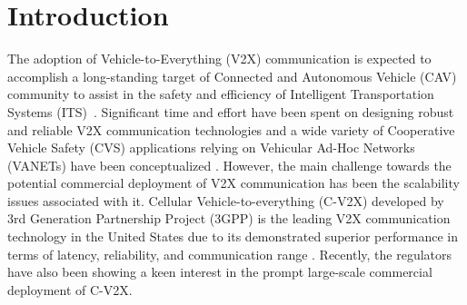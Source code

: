 \documentclass[iicol]{sn-jnl}%
\theoremstyle{thmstyleone}%
\theoremstyle{thmstyletwo}%
\theoremstyle{thmstylethree}%
\begin{document}
\section{Introduction}\label{sec1}
The adoption of Vehicle-to-Everything (V2X) communication is expected to accomplish a long-standing target of Connected and Autonomous Vehicle (CAV) community to assist in the safety and efficiency of Intelligent Transportation Systems (ITS){~\cite{cosgun2017towards}}. Significant time and effort have been spent on designing robust and reliable V2X communication technologies and a wide variety of Cooperative Vehicle Safety (CVS) applications relying on Vehicular Ad-Hoc Networks (VANETs) have been conceptualized \cite{ahmed2011vehicle}. However, the main challenge towards the potential commercial deployment of V2X communication has been the scalability issues associated with it. Cellular Vehicle-to-everything (C-V2X) \cite{molina2017lte} developed by 3rd Generation Partnership Project (3GPP) is the leading V2X communication technology in the United States due to its demonstrated superior performance in terms of latency, reliability, and communication range \cite{useof5.850}. Recently, the regulators have also been showing a keen interest in the prompt large-scale commercial deployment of C-V2X.
\end{document}
